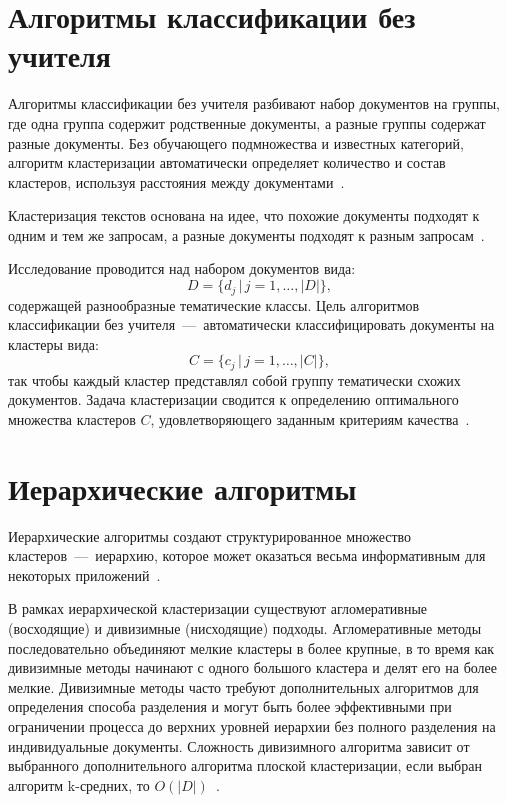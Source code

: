 \section{Алгоритмы классификации без учителя}

Алгоритмы классификации без учителя разбивают набор документов на группы, где одна группа содержит родственные документы, а разные группы содержат разные документы. 
Без обучающего подмножества и известных категорий, алгоритм кластеризации автоматически определяет количество и состав кластеров, используя расстояния между документами~\cite{main-book}.

Кластеризация текстов основана на идее, что похожие документы подходят к одним и тем же запросам, а разные документы подходят к разным запросам~\cite{main-book}.

Исследование проводится над набором документов вида:
\begin{equation}\label{eq:doc}
	D = \{d_j\,|\,j=1,\ldots,|D|\},
\end{equation}
содержащей разнообразные тематические классы.
Цель алгоритмов классификации без учителя~---~автоматически классифицировать документы на кластеры вида:
\begin{equation}\label{eq:claster}
	C = \{c_j\,|\,j=1,\ldots,|C|\},
\end{equation}
так чтобы каждый кластер представлял собой группу тематически схожих документов. 
Задача кластеризации сводится к определению оптимального множества кластеров \( C \), удовлетворяющего заданным критериям качества~\cite{main-book}.

\section{Иерархические алгоритмы}

Иерархические алгоритмы создают структурированное множество кластеров~---~иерархию, которое может оказаться весьма информативным для некоторых приложений~\cite{main-book}.

В рамках иерархической кластеризации существуют агломеративные (восходящие) и дивизимные (нисходящие) подходы. 
Агломеративные методы последовательно объединяют мелкие кластеры в более крупные, в то время как дивизимные методы начинают с одного большого кластера и делят его на более мелкие. 
Дивизимные методы часто требуют дополнительных алгоритмов для определения способа разделения и могут быть более эффективными при ограничении процесса до верхних уровней иерархии без полного разделения на индивидуальные документы.
Сложность дивизимного алгоритма зависит от выбранного дополнительного алгоритма плоской кластеризации, если выбран алгоритм k-средних, то $O(|D|)$~\cite{main-book}.

